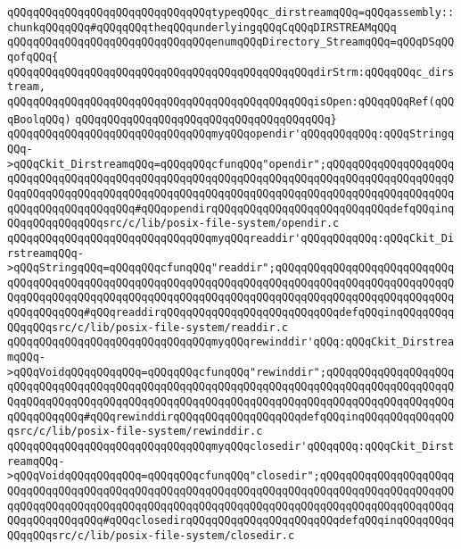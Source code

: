 \newline
\verb|qQQqqQQqqQQqqQQqqQQqqQQqqQQqqQQqtypeqQQqc_dirstreamqQQq=qQQqassembly::chunkqQQqqQQq#qQQqqQQqtheqQQqunderlyingqQQqCqQQqDIRSTREAMqQQq|\newline
\newline
\verb|qQQqqQQqqQQqqQQqqQQqqQQqqQQqqQQqenumqQQqDirectory_StreamqQQq=qQQqDSqQQqofqQQq{|\newline
\verb|qQQqqQQqqQQqqQQqqQQqqQQqqQQqqQQqqQQqqQQqqQQqqQQqdirStrm:qQQqqQQqc_dirstream,|\newline
\verb|qQQqqQQqqQQqqQQqqQQqqQQqqQQqqQQqqQQqqQQqqQQqqQQqisOpen:qQQqqQQqRef(qQQqBoolqQQq)|\newline
\verb|qQQqqQQqqQQqqQQqqQQqqQQqqQQqqQQqqQQqqQQq}|\newline
\newline
\verb|qQQqqQQqqQQqqQQqqQQqqQQqqQQqqQQqmyqQQqopendir'qQQqqQQqqQQq:qQQqStringqQQq->qQQqCkit_DirstreamqQQq=qQQqqQQqcfunqQQq"opendir";qQQqqQQqqQQqqQQqqQQqqQQqqQQqqQQqqQQqqQQqqQQqqQQqqQQqqQQqqQQqqQQqqQQqqQQqqQQqqQQqqQQqqQQqqQQqqQQqqQQqqQQqqQQqqQQqqQQqqQQqqQQqqQQqqQQqqQQqqQQqqQQqqQQqqQQqqQQqqQQqqQQqqQQqqQQqqQQqqQQq#qQQqopendirqQQqqQQqqQQqqQQqqQQqqQQqqQQqdefqQQqinqQQqqQQqqQQqqQQqsrc/c/lib/posix-file-system/opendir.c|\newline
\verb|qQQqqQQqqQQqqQQqqQQqqQQqqQQqqQQqmyqQQqreaddir'qQQqqQQqqQQq:qQQqCkit_DirstreamqQQq->qQQqStringqQQq=qQQqqQQqcfunqQQq"readdir";qQQqqQQqqQQqqQQqqQQqqQQqqQQqqQQqqQQqqQQqqQQqqQQqqQQqqQQqqQQqqQQqqQQqqQQqqQQqqQQqqQQqqQQqqQQqqQQqqQQqqQQqqQQqqQQqqQQqqQQqqQQqqQQqqQQqqQQqqQQqqQQqqQQqqQQqqQQqqQQqqQQqqQQqqQQqqQQqqQQq#qQQqreaddirqQQqqQQqqQQqqQQqqQQqqQQqqQQqdefqQQqinqQQqqQQqqQQqqQQqsrc/c/lib/posix-file-system/readdir.c|\newline
\verb|qQQqqQQqqQQqqQQqqQQqqQQqqQQqqQQqmyqQQqrewinddir'qQQq:qQQqCkit_DirstreamqQQq->qQQqVoidqQQqqQQqqQQq=qQQqqQQqcfunqQQq"rewinddir";qQQqqQQqqQQqqQQqqQQqqQQqqQQqqQQqqQQqqQQqqQQqqQQqqQQqqQQqqQQqqQQqqQQqqQQqqQQqqQQqqQQqqQQqqQQqqQQqqQQqqQQqqQQqqQQqqQQqqQQqqQQqqQQqqQQqqQQqqQQqqQQqqQQqqQQqqQQqqQQqqQQqqQQqqQQq#qQQqrewinddirqQQqqQQqqQQqqQQqqQQqdefqQQqinqQQqqQQqqQQqqQQqsrc/c/lib/posix-file-system/rewinddir.c|\newline
\verb|qQQqqQQqqQQqqQQqqQQqqQQqqQQqqQQqmyqQQqclosedir'qQQqqQQq:qQQqCkit_DirstreamqQQq->qQQqVoidqQQqqQQqqQQq=qQQqqQQqcfunqQQq"closedir";qQQqqQQqqQQqqQQqqQQqqQQqqQQqqQQqqQQqqQQqqQQqqQQqqQQqqQQqqQQqqQQqqQQqqQQqqQQqqQQqqQQqqQQqqQQqqQQqqQQqqQQqqQQqqQQqqQQqqQQqqQQqqQQqqQQqqQQqqQQqqQQqqQQqqQQqqQQqqQQqqQQqqQQqqQQqqQQq#qQQqclosedirqQQqqQQqqQQqqQQqqQQqqQQqdefqQQqinqQQqqQQqqQQqqQQqsrc/c/lib/posix-file-system/closedir.c|\newline
